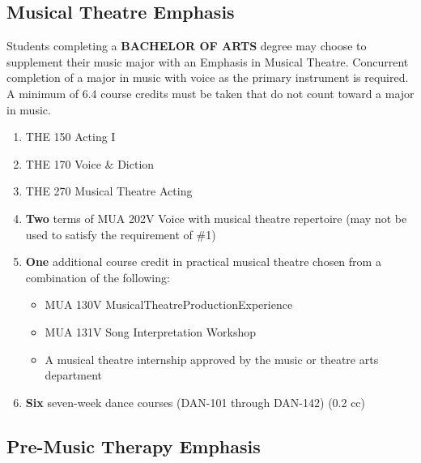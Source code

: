 \documentclass[
  letterpaper,
]{scrbook}
\providecommand{\tightlist}{%
  \setlength{\itemsep}{0pt}\setlength{\parskip}{0pt}}
\begin{document}
\subsection{Musical Theatre Emphasis}\label{musical-theatre-emphasis}

Students completing a \textbf{BACHELOR OF ARTS} degree may choose to
supplement their music major with an Emphasis in Musical Theatre.
Concurrent completion of a major in music with voice as the primary
instrument is required. A minimum of 6.4 course credits must be taken
that do not count toward a major in music.

\begin{enumerate}
\def\labelenumi{\arabic{enumi}.}
\tightlist
\item
  THE 150 Acting I
\item
  THE 170 Voice \& Diction
\item
  THE 270 Musical Theatre Acting
\item
  \textbf{Two} terms of MUA 202V Voice with musical theatre repertoire
  (may not be used to satisfy the requirement of \#1)
\item
  \textbf{One} additional course credit in practical musical theatre
  chosen from a combination of the following:

  \begin{itemize}
  \tightlist
  \item
    MUA 130V MusicalTheatreProductionExperience
  \item
    MUA 131V Song Interpretation Workshop
  \item
    A musical theatre internship approved by the music or theatre arts
    department
  \end{itemize}
\item
  \textbf{Six} seven-week dance courses (DAN-101 through DAN-142) (0.2
  cc)
\end{enumerate}

\subsection{Pre-Music Therapy
Emphasis}\label{pre-music-therapy-emphasis}
\end{document}
